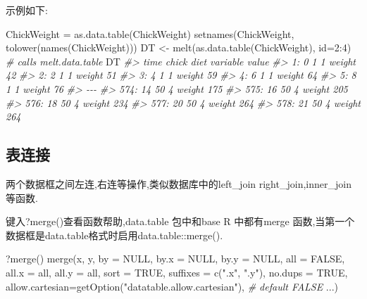 \documentclass[
]{book}
\newenvironment{Shaded}{\begin{snugshade}}{\end{snugshade}}
\newcommand{\AttributeTok}[1]{\textcolor[rgb]{0.77,0.63,0.00}{#1}}
\newcommand{\CommentTok}[1]{\textcolor[rgb]{0.56,0.35,0.01}{\textit{#1}}}
\newcommand{\ConstantTok}[1]{\textcolor[rgb]{0.00,0.00,0.00}{#1}}
\newcommand{\DecValTok}[1]{\textcolor[rgb]{0.00,0.00,0.81}{#1}}
\newcommand{\FunctionTok}[1]{\textcolor[rgb]{0.00,0.00,0.00}{#1}}
\newcommand{\NormalTok}[1]{#1}
\newcommand{\OtherTok}[1]{\textcolor[rgb]{0.56,0.35,0.01}{#1}}
\newcommand{\SpecialCharTok}[1]{\textcolor[rgb]{0.00,0.00,0.00}{#1}}
\newcommand{\StringTok}[1]{\textcolor[rgb]{0.31,0.60,0.02}{#1}}
\begin{document}
示例如下:

\begin{Shaded}
\begin{Highlighting}[]
\NormalTok{ChickWeight }\OtherTok{=} \FunctionTok{as.data.table}\NormalTok{(ChickWeight)}
\FunctionTok{setnames}\NormalTok{(ChickWeight, }\FunctionTok{tolower}\NormalTok{(}\FunctionTok{names}\NormalTok{(ChickWeight)))}
\NormalTok{DT }\OtherTok{\textless{}{-}} \FunctionTok{melt}\NormalTok{(}\FunctionTok{as.data.table}\NormalTok{(ChickWeight), }\AttributeTok{id=}\DecValTok{2}\SpecialCharTok{:}\DecValTok{4}\NormalTok{) }\CommentTok{\# calls melt.data.table}
\NormalTok{DT}
\CommentTok{\#\textgreater{}      time chick diet variable value}
\CommentTok{\#\textgreater{}   1:    0     1    1   weight    42}
\CommentTok{\#\textgreater{}   2:    2     1    1   weight    51}
\CommentTok{\#\textgreater{}   3:    4     1    1   weight    59}
\CommentTok{\#\textgreater{}   4:    6     1    1   weight    64}
\CommentTok{\#\textgreater{}   5:    8     1    1   weight    76}
\CommentTok{\#\textgreater{}  {-}{-}{-}                               }
\CommentTok{\#\textgreater{} 574:   14    50    4   weight   175}
\CommentTok{\#\textgreater{} 575:   16    50    4   weight   205}
\CommentTok{\#\textgreater{} 576:   18    50    4   weight   234}
\CommentTok{\#\textgreater{} 577:   20    50    4   weight   264}
\CommentTok{\#\textgreater{} 578:   21    50    4   weight   264}
\end{Highlighting}
\end{Shaded}

\hypertarget{ux8868ux8fdeux63a5}{%
\subsection{表连接}\label{ux8868ux8fdeux63a5}}

两个数据框之间左连,右连等操作,类似数据库中的left\_join right\_join,inner\_join 等函数.

键入?merge()查看函数帮助,data.table 包中和base R 中都有merge 函数,当第一个数据框是data.table格式时启用data.table::merge().

\begin{Shaded}
\begin{Highlighting}[]
\NormalTok{?}\FunctionTok{merge}\NormalTok{()}
\FunctionTok{merge}\NormalTok{(x, y, }\AttributeTok{by =} \ConstantTok{NULL}\NormalTok{, }\AttributeTok{by.x =} \ConstantTok{NULL}\NormalTok{, }\AttributeTok{by.y =} \ConstantTok{NULL}\NormalTok{, }\AttributeTok{all =} \ConstantTok{FALSE}\NormalTok{,}
\AttributeTok{all.x =}\NormalTok{ all, }\AttributeTok{all.y =}\NormalTok{ all, }\AttributeTok{sort =} \ConstantTok{TRUE}\NormalTok{, }\AttributeTok{suffixes =} \FunctionTok{c}\NormalTok{(}\StringTok{".x"}\NormalTok{, }\StringTok{".y"}\NormalTok{), }\AttributeTok{no.dups =} \ConstantTok{TRUE}\NormalTok{,}
\AttributeTok{allow.cartesian=}\FunctionTok{getOption}\NormalTok{(}\StringTok{"datatable.allow.cartesian"}\NormalTok{),  }\CommentTok{\# default FALSE}
\NormalTok{...)}
\end{Highlighting}
\end{Shaded}
\end{document}
